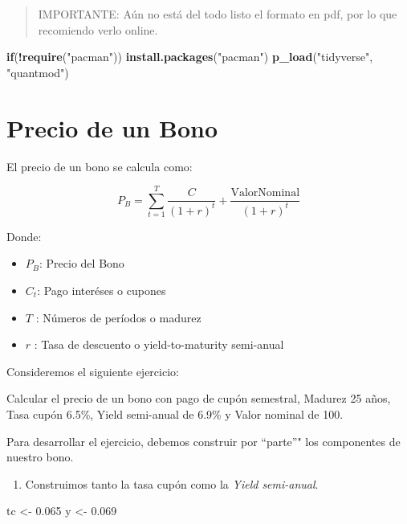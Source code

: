 \documentclass[12pt,]{book}
\newenvironment{Shaded}{\begin{snugshade}}{\end{snugshade}}
\newcommand{\KeywordTok}[1]{\textcolor[rgb]{0.13,0.29,0.53}{\textbf{#1}}}
\newcommand{\FloatTok}[1]{\textcolor[rgb]{0.00,0.00,0.81}{#1}}
\newcommand{\StringTok}[1]{\textcolor[rgb]{0.31,0.60,0.02}{#1}}
\newcommand{\ControlFlowTok}[1]{\textcolor[rgb]{0.13,0.29,0.53}{\textbf{#1}}}
\newcommand{\OperatorTok}[1]{\textcolor[rgb]{0.81,0.36,0.00}{\textbf{#1}}}
\newcommand{\NormalTok}[1]{#1}
\providecommand{\tightlist}{%
  \setlength{\itemsep}{0pt}\setlength{\parskip}{0pt}}
\begin{document}
\begin{quote}
IMPORTANTE: Aún no está del todo listo el formato en pdf, por lo que
recomiendo verlo online.
\end{quote}

\begin{Shaded}
\begin{Highlighting}[]
\ControlFlowTok{if}\NormalTok{(}\OperatorTok{!}\KeywordTok{require}\NormalTok{(}\StringTok{"pacman"}\NormalTok{)) }\KeywordTok{install.packages}\NormalTok{(}\StringTok{"pacman"}\NormalTok{)}
\KeywordTok{p_load}\NormalTok{(}\StringTok{"tidyverse"}\NormalTok{, }\StringTok{"quantmod"}\NormalTok{)}
\end{Highlighting}
\end{Shaded}

\section{Precio de un Bono}\label{precio-de-un-bono}

El precio de un bono se calcula como:

\[
P_{B} = \sum_{t=1}^{T} \frac{C}{(1+r)^t} + \frac{\text{ValorNominal}}{(1+r)^t}
\]

Donde:

\begin{itemize}
\tightlist
\item
  \(P_B\): Precio del Bono
\item
  \(C_t\): Pago interéses o cupones
\item
  \(T\) : Números de períodos o madurez
\item
  \(r\) : Tasa de descuento o yield-to-maturity semi-anual
\end{itemize}

Consideremos el siguiente ejercicio:

Calcular el precio de un bono con pago de cupón semestral, Madurez 25
años, Tasa cupón 6.5\%, Yield semi-anual de 6.9\% y Valor nominal de
100.

Para desarrollar el ejercicio, debemos construir por ``parte''" los
componentes de nuestro bono.

\begin{enumerate}
\def\labelenumi{\arabic{enumi}.}
\tightlist
\item
  Construimos tanto la tasa cupón como la \emph{Yield semi-anual}.
\end{enumerate}

\begin{Shaded}
\begin{Highlighting}[]
\NormalTok{tc <-}\StringTok{ }\FloatTok{0.065}
\NormalTok{y  <-}\StringTok{ }\FloatTok{0.069}
\end{Highlighting}
\end{Shaded}
\end{document}
